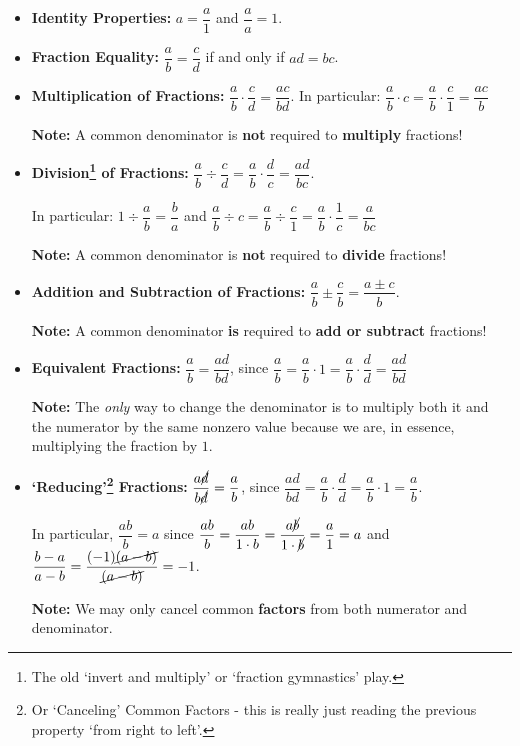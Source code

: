 \documentclass{ximera}
\begin{document}
\begin{itemize}

\item  \textbf{Identity Properties:}  $a = \dfrac{a}{1}$ and $\dfrac{a}{a} = 1$.

\item  \textbf{Fraction Equality:}  $\dfrac{a}{b} = \dfrac{c}{d}$ if and only if $ad = bc$. 

\item  \textbf{Multiplication of Fractions:}  $\dfrac{a}{b} \cdot \dfrac{c}{d} = \dfrac{ac}{bd}$. In particular:  $\dfrac{a}{b} \cdot c = \dfrac{a}{b} \cdot \dfrac{c}{1} = \dfrac{ac}{b}$

\textbf{Note:}  A common denominator is \textbf{not} required to \textbf{multiply} fractions!

\item  \textbf{Division\footnote{The old `invert and multiply' or `fraction gymnastics' play.} of Fractions:}  $\dfrac{a}{b} \div \dfrac{c}{d} = \dfrac{a}{b} \cdot \dfrac{d}{c} = \dfrac{ad}{bc}$. 

In particular: $1 \div \dfrac{a}{b} = \dfrac{b}{a}$ and  $\dfrac{a}{b} \div c = \dfrac{a}{b} \div \dfrac{c}{1}  = \dfrac{a}{b} \cdot \dfrac{1}{c} = \dfrac{a}{bc}$

\textbf{Note:}  A common denominator is \textbf{not} required to \textbf{divide} fractions!

\item  \textbf{Addition and Subtraction of Fractions:}  $\dfrac{a}{b} \pm \dfrac{c}{b} = \dfrac{a \pm c}{b}$.  

\textbf{Note:}  A common denominator \textbf{is} required to \textbf{add or subtract} fractions!

\item  \textbf{Equivalent Fractions:}  $\dfrac{a}{b} = \dfrac{ad}{bd}$, since $ \dfrac{a}{b} = \dfrac{a}{b} \cdot 1 = \dfrac{a}{b} \cdot \dfrac{d}{d} = \dfrac{ad}{bd}$

\textbf{Note:}  The \textit{only} way to change the denominator is to multiply both it and the numerator by the same nonzero value because we are, in essence, multiplying the fraction by $1$.

\item  \textbf{`Reducing'\footnote{Or `Canceling' Common Factors - this is really just reading the previous property `from right to left'.} Fractions:} $\dfrac{a\cancel{d}}{b\cancel{d}} = \dfrac{a}{b}$, since  $\dfrac{ad}{bd} = \dfrac{a}{b} \cdot \dfrac{d}{d} = \dfrac{a}{b} \cdot 1 = \dfrac{a}{b}$.

In particular, $\dfrac{ab}{b} = a$ since $\dfrac{ab}{b} = \dfrac{ab}{1 \cdot b} =  \dfrac{a \cancel{b}}{1 \cdot \cancel{b}} = \dfrac{a}{1} = a$ and $\dfrac{b-a}{a-b} = \dfrac{(-1)\cancel{(a-b)}}{\cancel{(a-b)}} = -1$.

\textbf{Note:}  We may only cancel common \textbf{factors} from both numerator and denominator.

\end{itemize}
\end{document}
